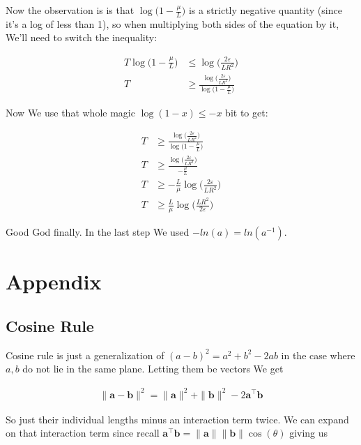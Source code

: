 \documentclass{article}
\begin{document}
			Now the observation is is that $\log \big(1- \frac{\mu}{L} \big)$ is a strictly negative quantity (since it's a log of less than 1), so when multiplying both sides of the equation by it, We'll need to switch the inequality:
		
			\begin{align*}
				T\log \bigg(1- \frac{\mu}{L} \bigg) &\le \log\bigg( \frac{2\varepsilon}{LR^2}\bigg) \\
				T  &\ge \frac{\log\bigg( \frac{2\varepsilon}{LR^2}\bigg)}{\log \big(1- \frac{\mu}{L} \big)} 
			\end{align*}
			
			Now We use that whole magic $\log(1 - x) \le -x$ bit to get:
		
			\begin{align*}
				T  &\ge \frac{\log\bigg( \frac{2\varepsilon}{LR^2}\bigg)}{\log \big(1- \frac{\mu}{L} \big)} \\
				T  &\ge \frac{\log\bigg( \frac{2\varepsilon}{LR^2}\bigg)}{- \frac{\mu}{L}} \\
				T  &\ge - \frac{L}{\mu}\log\bigg( \frac{2\varepsilon}{LR^2}\bigg) \\
				T  &\ge \frac{L}{\mu}\log\bigg( \frac{LR^2}{2\varepsilon}\bigg)
			\end{align*}
			
			Good God finally. In the last step We used $-ln(a) = ln(a^{-1})$.
			
					
\newpage
\section{Appendix}

	\subsection{Cosine Rule}
	
		Cosine rule is just a generalization of $(a-b)^2 = a^2 + b^2 - 2ab$ in the case where $a, b$ do not lie in the same plane. Letting them be vectors We get
		
		\begin{align*}
			\|\mathbf{a - b}\|^2 = \|\mathbf{a}\|^2 + \|\mathbf{b}\|^2 - 2\mathbf{a}^\top\mathbf{b} 
		\end{align*}
		
		So just their individual lengths minus an interaction term twice. We can expand on that interaction term since recall $\mathbf{a}^\top\mathbf{b} = \|\mathbf{a}\|\|\mathbf{b}\|\cos(\theta)$ giving us
		
\end{document}
